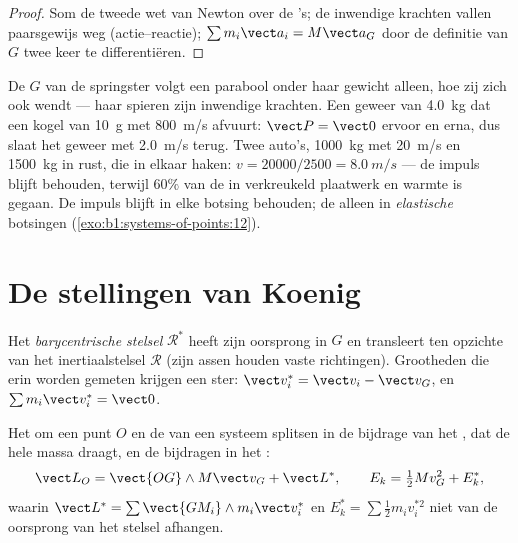 \begin{proof}
Som de tweede wet van Newton over de 's; de inwendige krachten vallen
paarsgewijs weg (actie--reactie); $\sum m_i\vect a_i = M\vect a_G$ door
de definitie van $G$ twee keer te differentiëren.
\end{proof}

\begin{example}\label{ex:b1:systems-of-points:cm}
De $G$ van de springster volgt een parabool onder haar gewicht alleen, hoe zij
zich ook wendt --- haar spieren zijn inwendige krachten. Een geweer van \qty{4.0}{kg}
dat een kogel van \qty{10}{g} met \qty{800}{m/s} afvuurt: $\vect P = \vect 0$ ervoor
en erna, dus slaat het geweer met \qty{2.0}{m/s} terug. Twee auto's, \qty{1000}{kg}
met \qty{20}{m/s} en \qty{1500}{kg} in rust, die in elkaar haken: $v =
20000/2500 = \qty{8.0}{m/s}$ --- de impuls blijft behouden, terwijl $60\%$ van de
 in verkreukeld plaatwerk en warmte is gegaan. De impuls blijft
in elke botsing behouden; de  alleen in \emph{elastische}
botsingen (\cref{exo:b1:systems-of-points:12}).
\end{example}

\section{De stellingen van Koenig}

\begin{definition}\label{def:b1:systems-of-points:barycentric}
Het \emph{barycentrische stelsel} $\mathcal R^*$ heeft zijn oorsprong in $G$ en
transleert ten opzichte van het inertiaalstelsel $\mathcal R$ (zijn assen
houden vaste richtingen). Grootheden die erin worden gemeten krijgen een ster: $\vect v_i^*
= \vect v_i - \vect v_G$, en $\sum m_i\vect v_i^* = \vect 0$.
\end{definition}

\begin{theorem}\label{thm:b1:systems-of-points:koenig}
Het  om een punt $O$ en de  van een
systeem splitsen in de bijdrage van het , dat de hele
massa draagt, en de bijdragen in het :
\[
\vect L_O = \vect{OG}\wedge M\vect v_G + \vect L^*, \qquad
E_k = \tfrac12 Mv_G^2 + E_k^*,
\]
waarin $\vect L^* = \sum\vect{GM_i}\wedge m_i\vect v_i^*$ en $E_k^* = \sum\tfrac12
m_iv_i^{*2}$ niet van de oorsprong van het stelsel afhangen.
\end{theorem}


